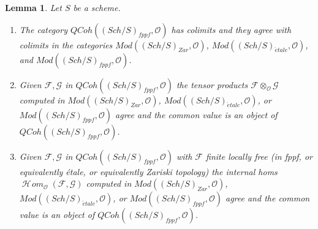 \documentclass{stacks-project}
\theoremstyle{plain}
\newtheorem{lemma}[subsection]{Lemma}
\theoremstyle{definition}
\theoremstyle{remark}
\numberwithin{equation}{subsection}
\def\SheafHom{\mathop{\mathcal{H}\!\mathit{om}}\nolimits}
\def\Sch{\mathit{Sch}}
\def\etale{{\acute{e}tale}}
\def\QCoh{\mathit{QCoh}}
\begin{document}
\begin{lemma}
\label{lemma-qc-colimits}
Let $S$ be a scheme.
\begin{enumerate}
\item The category $\QCoh((\Sch/S)_{fppf}, \mathcal{O})$
has colimits and they agree with colimits in the categories
$\textit{Mod}((\Sch/S)_{Zar}, \mathcal{O})$,
$\textit{Mod}((\Sch/S)_\etale, \mathcal{O})$, and
$\textit{Mod}((\Sch/S)_{fppf}, \mathcal{O})$.
\item Given $\mathcal{F}, \mathcal{G}$ in $\QCoh((\Sch/S)_{fppf}, \mathcal{O})$
the tensor products $\mathcal{F} \otimes_\mathcal{O} \mathcal{G}$
computed in $\textit{Mod}((\Sch/S)_{Zar}, \mathcal{O})$,
$\textit{Mod}((\Sch/S)_\etale, \mathcal{O})$, or
$\textit{Mod}((\Sch/S)_{fppf}, \mathcal{O})$ agree and the common value
is an object of $\QCoh((\Sch/S)_{fppf}, \mathcal{O})$.
\item Given $\mathcal{F}, \mathcal{G}$ in $\QCoh((\Sch/S)_{fppf}, \mathcal{O})$
with $\mathcal{F}$ finite locally free (in fppf, or equivalently \'etale, or
equivalently Zariski topology) the internal homs
$\SheafHom_\mathcal{O}(\mathcal{F}, \mathcal{G})$
computed in $\textit{Mod}((\Sch/S)_{Zar}, \mathcal{O})$,
$\textit{Mod}((\Sch/S)_\etale, \mathcal{O})$, or
$\textit{Mod}((\Sch/S)_{fppf}, \mathcal{O})$ agree and the common value
is an object of $\QCoh((\Sch/S)_{fppf}, \mathcal{O})$.
\end{enumerate}
\end{lemma}
\end{document}
